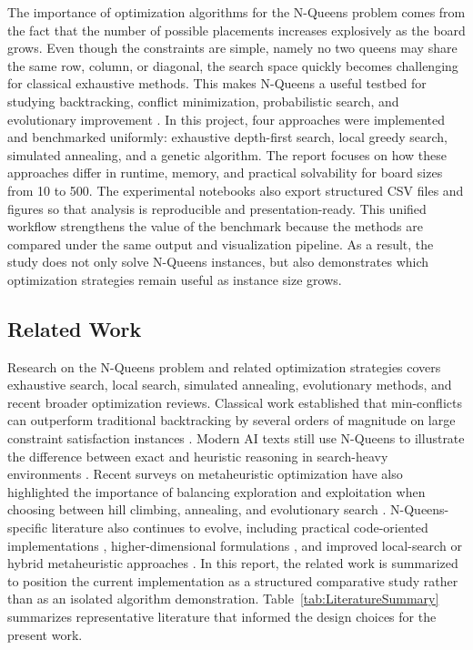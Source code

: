 \documentclass[conference]{IEEEtran}
\begin{document}
The importance of optimization algorithms for the N-Queens problem comes from the fact that the number of possible placements increases explosively as the board grows. Even though the constraints are simple, namely no two queens may share the same row, column, or diagonal, the search space quickly becomes challenging for classical exhaustive methods. This makes N-Queens a useful testbed for studying backtracking, conflict minimization, probabilistic search, and evolutionary improvement \cite{minton1992minconflicts,kirkpatrick1983optimization,jain2023efficient}. In this project, four approaches were implemented and benchmarked uniformly: exhaustive depth-first search, local greedy search, simulated annealing, and a genetic algorithm. The report focuses on how these approaches differ in runtime, memory, and practical solvability for board sizes from 10 to 500. The experimental notebooks also export structured CSV files and figures so that analysis is reproducible and presentation-ready. This unified workflow strengthens the value of the benchmark because the methods are compared under the same output and visualization pipeline. As a result, the study does not only solve N-Queens instances, but also demonstrates which optimization strategies remain useful as instance size grows.

\subsection{Related Work}
Research on the N-Queens problem and related optimization strategies covers exhaustive search, local search, simulated annealing, evolutionary methods, and recent broader optimization reviews. Classical work established that min-conflicts can outperform traditional backtracking by several orders of magnitude on large constraint satisfaction instances \cite{minton1992minconflicts}. Modern AI texts still use N-Queens to illustrate the difference between exact and heuristic reasoning in search-heavy environments \cite{russell2021aima}. Recent surveys on metaheuristic optimization have also highlighted the importance of balancing exploration and exploitation when choosing between hill climbing, annealing, and evolutionary search \cite{benaissa2024metaheuristic,houssein2024metaheuristics,salgotra2024systematic,rashed2024advancements}. N-Queens-specific literature also continues to evolve, including practical code-oriented implementations \cite{jain2023efficient}, higher-dimensional formulations \cite{kunt2024higher}, and improved local-search or hybrid metaheuristic approaches \cite{hussein2024nmra}. In this report, the related work is summarized to position the current implementation as a structured comparative study rather than as an isolated algorithm demonstration. Table~\ref{tab:LiteratureSummary} summarizes representative literature that informed the design choices for the present work.
\end{document}
